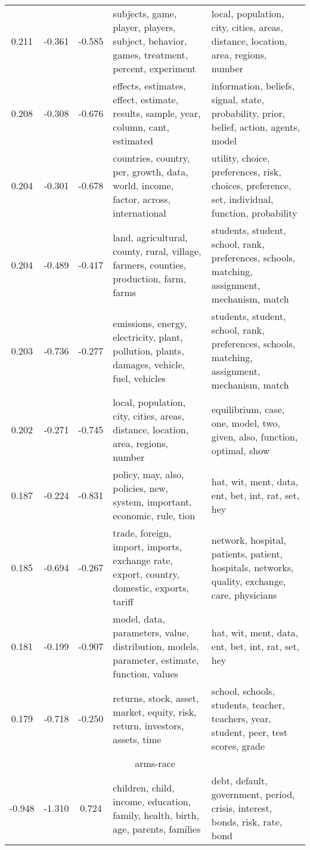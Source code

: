 \begin{tabular}{cccp{5cm}p{5cm}}
0.211 & -0.361 & -0.585 & subjects, game, player, players, subject, behavior, games, treatment, percent, experiment & local, population, city, cities, areas, distance, location, area, regions, number \\
0.208 & -0.308 & -0.676 & effects, estimates, effect, estimate, results, sample, year, column, cant, estimated & information, beliefs, signal, state, probability, prior, belief, action, agents, model \\
0.204 & -0.301 & -0.678 & countries, country, per, growth, data, world, income, factor, across, international & utility, choice, preferences, risk, choices, preference, set, individual, function, probability \\
0.204 & -0.489 & -0.417 & land, agricultural, county, rural, village, farmers, counties, production, farm, farms & students, student, school, rank, preferences, schools, matching, assignment, mechanism, match \\
0.203 & -0.736 & -0.277 & emissions, energy, electricity, plant, pollution, plants, damages, vehicle, fuel, vehicles & students, student, school, rank, preferences, schools, matching, assignment, mechanism, match \\
0.202 & -0.271 & -0.745 & local, population, city, cities, areas, distance, location, area, regions, number & equilibrium, case, one, model, two, given, also, function, optimal, show \\
0.187 & -0.224 & -0.831 & policy, may, also, policies, new, system, important, economic, rule, tion & hat, wit, ment, data, ent, bet, int, rat, set, hey \\
0.185 & -0.694 & -0.267 & trade, foreign, import, imports, exchange rate, export, country, domestic, exports, tariff & network, hospital, patients, patient, hospitals, networks, quality, exchange, care, physicians \\
0.181 & -0.199 & -0.907 & model, data, parameters, value, distribution, models, parameter, estimate, function, values & hat, wit, ment, data, ent, bet, int, rat, set, hey \\
0.179 & -0.718 & -0.250 & returns, stock, asset, market, equity, risk, return, investors, assets, time & school, schools, students, teacher, teachers, year, student, peer, test scores, grade \\
\midrule
\multicolumn{5}{c}{arms-race}\\
-0.948 & -1.310 & 0.724 & children, child, income, education, family, health, birth, age, parents, families & debt, default, government, period, crisis, interest, bonds, risk, rate, bond \\

\end{tabular}
